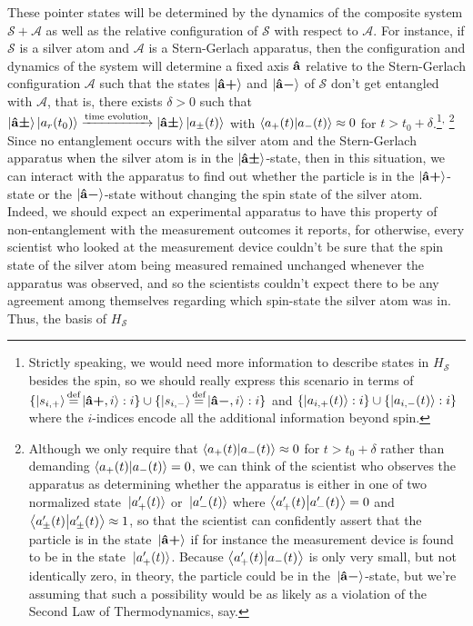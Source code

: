 %
    These pointer states will be determined by the  dynamics of the composite system $\mathcal{S}+\mathcal{A}$ as well as the relative configuration of $\mathcal{S}$ with respect to $\mathcal{A}$. For instance, if $\mathcal{S}$ is a silver atom and $\mathcal{A}$ is a Stern-Gerlach apparatus, then the configuration and dynamics of the system will determine a fixed axis $\vb{\hat{{a}}}$ relative to the Stern-Gerlach configuration $\mathcal{A}$ such that the states $\ket{{\vb{\hat{{a}}}\bm{+}}}$ and $\ket{{\vb{\hat{{a}}}\bm{-}}}$ of $\mathcal{S}$ don't get entangled with $\mathcal{A}$, that is, there exists $\delta>0$ such that $\ket{{\vb{\hat{{a}}}\bm{\pm}}}\ket{a_r(t_0)}\xrightarrow{\text{time evolution}}\ket{{\vb{\hat{{a}}}\bm{\pm}}}\ket{a_\pm(t)}$ with $\ip{a_+(t)}{a_-(t)}\approx 0$ for $t> t_0+\delta$.\footnote{%
    Strictly speaking, we would  need more information to describe states in $H_\mathcal{S}$ besides the spin, so we should really express this scenario in terms of $\{\ket{s_{i,+}}\myeq \ket{\uvbp{a},i}:i\}\cup \{\ket{s_{i,-}}\myeq \ket{\uvbm{a},i}:i\}$ and  $\{\ket{a_{i,+}(t)}:i\}\cup\{\ket{a_{i,-}(t)}:i\}$ where the $i$-indices encode all the additional information beyond spin.
    }\textsuperscript{, }\footnote{\label{nearzero}Although 
    we only require that  $\ip{a_+(t)}{a_-(t)}\approx 0$ for $t> t_0+\delta$ rather than demanding $\ip{a_+(t)}{a_-(t)} = 0$, we can think of the scientist who observes the apparatus as determining whether the apparatus is either in one of two normalized state $\ket*{a_+'(t)}$ or $\ket*{a_-'(t)}$ where 
    $\ip{a_+'(t)}{a_-'(t)} = 0$ 
    and $\ip{a_\pm'(t)}{a_\pm'(t)}\approx 1$, so that the scientist can confidently assert that the particle is in the state $\ket*{{\vb{\hat{{a}}}\bm{+}}}$ if for instance the measurement device is found to be in the state $\ket*{a_+'(t)}$. Because $\ip{a_+'(t)}{a_-(t)}$ is only very small, but not identically zero, in theory, the particle could be in the $\ket*{{\vb{\hat{{a}}}\bm{-}}}$-state, but we're assuming that such a possibility would be as likely as a violation of the Second Law of Thermodynamics, say.}
    Since no entanglement occurs with the silver atom and the Stern-Gerlach apparatus when the silver atom is in the $\ket{{\vb{\hat{{a}}}\bm{\pm}}}$-state, then in this situation, we can interact with the apparatus to find out whether the particle is in the $\ket{{\vb{\hat{{a}}}\bm{+}}}$-state or the $\ket{{\vb{\hat{{a}}}\bm{-}}}$-state without changing the spin state of the silver atom. Indeed, we should expect an experimental apparatus to have this property of non-entanglement with the measurement outcomes it reports, for otherwise, every scientist who looked at the measurement device couldn't be sure that the spin state of the silver atom being measured remained unchanged whenever the apparatus was observed, and so the scientists couldn't expect there to be any agreement among themselves  regarding which spin-state the silver atom was in. Thus, the basis of $H_\mathcal{S}$ 
